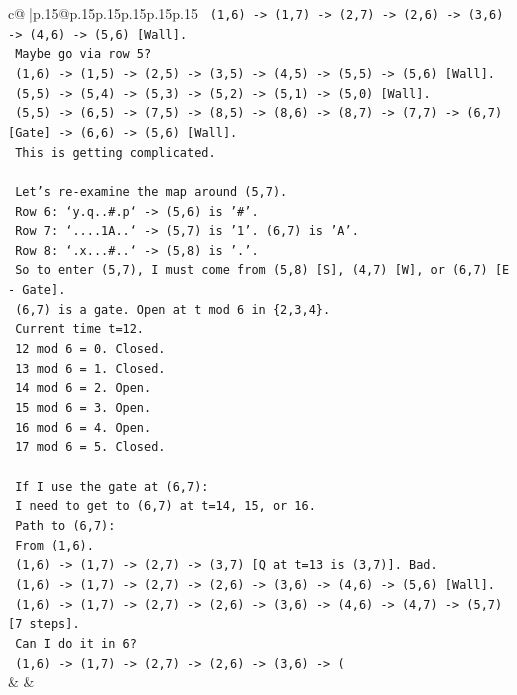 \documentclass{article}
\begin{document}
{\begin{supertabular}{c@{$\;$}|p{.15\linewidth}@{}p{.15\linewidth}p{.15\linewidth}p{.15\linewidth}p{.15\linewidth}p{.15\linewidth}}
{{{\texttt{    (1,6) {-}> (1,7) {-}> (2,7) {-}> (2,6) {-}> (3,6) {-}> (4,6) {-}> (5,6) {[}Wall{]}.} \\
\texttt{    Maybe go via row 5?} \\
\texttt{    (1,6) {-}> (1,5) {-}> (2,5) {-}> (3,5) {-}> (4,5) {-}> (5,5) {-}> (5,6) {[}Wall{]}.} \\
\texttt{    (5,5) {-}> (5,4) {-}> (5,3) {-}> (5,2) {-}> (5,1) {-}> (5,0) {[}Wall{]}.} \\
\texttt{    (5,5) {-}> (6,5) {-}> (7,5) {-}> (8,5) {-}> (8,6) {-}> (8,7) {-}> (7,7) {-}> (6,7) {[}Gate{]} {-}> (6,6) {-}> (5,6) {[}Wall{]}.} \\
\texttt{    This is getting complicated.} \\
\\ 
\texttt{    Let's re{-}examine the map around (5,7).} \\
\texttt{    Row 6: `y.q..\#.p` {-}> (5,6) is '\#'.} \\
\texttt{    Row 7: `....1A..` {-}> (5,7) is '1'. (6,7) is 'A'.} \\
\texttt{    Row 8: `.x...\#..` {-}> (5,8) is '.'.} \\
\texttt{    So to enter (5,7), I must come from (5,8) {[}S{]}, (4,7) {[}W{]}, or (6,7) {[}E {-} Gate{]}.} \\
\texttt{    (6,7) is a gate. Open at t mod 6 in \{2,3,4\}.} \\
\texttt{    Current time t=12.} \\
\texttt{    12 mod 6 = 0. Closed.} \\
\texttt{    13 mod 6 = 1. Closed.} \\
\texttt{    14 mod 6 = 2. Open.} \\
\texttt{    15 mod 6 = 3. Open.} \\
\texttt{    16 mod 6 = 4. Open.} \\
\texttt{    17 mod 6 = 5. Closed.} \\
\\ 
\texttt{    If I use the gate at (6,7):} \\
\texttt{    I need to get to (6,7) at t=14, 15, or 16.} \\
\texttt{    Path to (6,7):} \\
\texttt{    From (1,6).} \\
\texttt{    (1,6) {-}> (1,7) {-}> (2,7) {-}> (3,7) {[}Q at t=13 is (3,7){]}. Bad.} \\
\texttt{    (1,6) {-}> (1,7) {-}> (2,7) {-}> (2,6) {-}> (3,6) {-}> (4,6) {-}> (5,6) {[}Wall{]}.} \\
\texttt{    (1,6) {-}> (1,7) {-}> (2,7) {-}> (2,6) {-}> (3,6) {-}> (4,6) {-}> (4,7) {-}> (5,7) {[}7 steps{]}.} \\
\texttt{    Can I do it in 6?} \\
\texttt{    (1,6) {-}> (1,7) {-}> (2,7) {-}> (2,6) {-}> (3,6) {-}> (} \\
            }
        }
    }
    & & \\ \\


\end{supertabular}}
\end{document}
